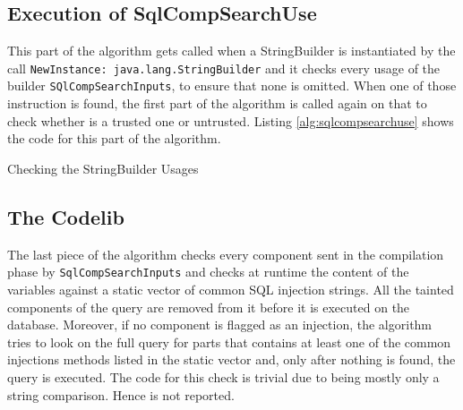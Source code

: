 \subsection{Execution of SqlCompSearchUse}
This part of the algorithm gets called when a StringBuilder is instantiated by the call \texttt{NewInstance: java.lang.StringBuilder} and it checks every usage of the builder \texttt{SQlCompSearchInputs}, to ensure that none is omitted. When one of those instruction is found, the first part of the algorithm is called again on that to check whether is a trusted one or untrusted. Listing \ref{alg:sqlcompsearchuse} shows the code for this part of the algorithm.

\begin{algorithm}
\caption{Checking the StringBuilder Usages}
\label{alg:sqlcompsearchuse}
\end{algorithm}

\subsection{The Codelib}
The last piece of the algorithm checks every component sent in the compilation phase by \texttt{SqlCompSearchInputs} and checks at runtime the content of the variables against a static vector of common SQL injection strings. All the tainted components of the query are removed from it before it is executed on the database. Moreover, if no component is flagged as an injection, the algorithm tries to look on the full query for parts that contains at least one of the common injections methods listed in the static vector and, only after nothing is found, the query is executed. The code for this check is trivial due to being mostly only a string comparison. Hence is not reported.

